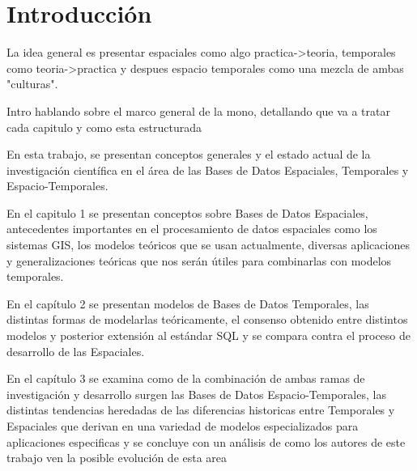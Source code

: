 \chapter{Introducción} \label{cap:intro}

La idea general es presentar espaciales como algo practica->teoria, temporales como teoria->practica y despues espacio temporales como una mezcla de ambas "culturas".

Intro hablando sobre el marco general de la mono, detallando que va a tratar cada capitulo y como esta estructurada

En esta trabajo, se presentan conceptos generales y el estado actual de la investigación científica en el área de las Bases de Datos Espaciales, Temporales y Espacio-Temporales.

En el capitulo 1 se presentan conceptos sobre Bases de Datos Espaciales, antecedentes importantes en el procesamiento de datos espaciales como los sistemas GIS, los modelos teóricos que se usan actualmente, diversas aplicaciones y generalizaciones teóricas que nos serán útiles para combinarlas con modelos temporales.

En el capítulo 2 se presentan modelos de Bases de Datos Temporales, las distintas formas de modelarlas teóricamente, el consenso obtenido entre distintos modelos y posterior extensión al estándar SQL y se compara contra el proceso de desarrollo de las Espaciales.

En el capítulo 3 se examina como de la combinación de ambas ramas de investigación y desarrollo surgen las Bases de Datos Espacio-Temporales, las distintas tendencias heredadas de las diferencias historicas entre Temporales y Espaciales que derivan en una variedad de modelos especializados para aplicaciones especificas y se concluye con un análisis de como los autores de este trabajo ven la posible evolución de esta area